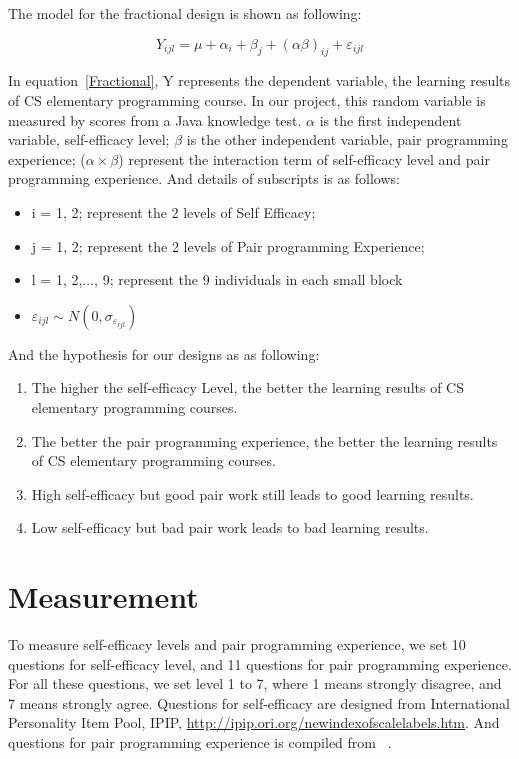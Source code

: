 \documentclass{sigchi}
\begin{document}
The model for the fractional design is shown as following:

\begin{equation}
\label{Fractional}
Y_{ijl} = \mu + \alpha_i + \beta_j + (\alpha \beta)_{ij} + \varepsilon_{ijl}
\end{equation}

In equation~\eqref{Fractional},   Y represents the dependent variable, the learning results of CS elementary programming course. In our project, this random variable is measured by scores from a Java knowledge test. $\alpha$ is the first independent variable, self-efficacy level;  $\beta$ is the other independent variable, pair programming experience; ($\alpha \times \beta$) represent the interaction term of self-efficacy level and pair programming experience. And details of subscripts is as follows:

\begin{itemize}
\item i = 1, 2; represent the 2 levels of Self Efficacy; 
\item j = 1, 2; represent the 2 levels of Pair programming Experience;
\item l = 1, 2,$\dots$, 9; represent the 9 individuals in each small block
\item $\varepsilon_{ijl} \sim  N(0, \sigma_{\varepsilon_{ijl}})$
\end{itemize}

And the hypothesis for our designs as as following:

\begin{enumerate}
\item The higher the self-efficacy Level, the better the learning results of CS elementary programming courses. 
\item The better the pair programming experience, the better the learning results of CS elementary programming courses. 
\item High self-efficacy but good pair work still leads to good learning results.
\item Low self-efficacy but bad pair work leads to bad learning results.
\end{enumerate}


\section{Measurement}
To measure self-efficacy levels and pair programming experience,
we set 10 questions for self-efficacy level, and 11 questions for pair programming experience. For all these questions, we set level 1 to 7, where 1 means strongly disagree, and 7 means strongly agree. Questions for self-efficacy are designed from International Personality Item Pool, IPIP, \url{http://ipip.ori.org/newindexofscalelabels.htm}. And questions for pair programming experience is compiled from ~\cite{salleh2014investigating}.
\end{document}
